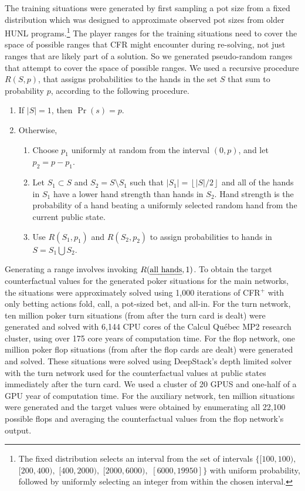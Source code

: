 The training situations were generated by first sampling a pot size from a fixed distribution which was designed to approximate observed pot sizes from older HUNL programs.\footnote{The fixed distribution selects an interval from the set of intervals $\{[100, 100),$ $[200,400),$ $[400, 2000),$ $[2000, 6000),$ $[6000, 19950]\}$ with uniform probability, followed by uniformly selecting an integer from within the chosen interval.}
The player ranges for the training situations need to cover the space of possible ranges that CFR might encounter during re-solving, not just ranges that are likely part of a solution.  So we generated pseudo-random ranges that attempt to cover the space of possible ranges.  We used a recursive procedure $R(S, p)$, that assigns probabilities to the hands in the set $S$ that sum to probability $p$, according to the following procedure.
\begin{enumerate}
\item If $|S| =1$, then $\Pr(s) = p$.
\item Otherwise,
\begin{enumerate}
\item Choose $p_1$ uniformly at random from the interval $(0, p)$, and let $p_2 = p-p_1$.
\item Let $S_1 \subset S$ and $S_2 = S \setminus S_1$ such that $|S_1| = \left\lfloor|S|/2\right\rfloor$ and all of the hands in $S_1$ have a lower hand strength than hands in $S_2$.  Hand strength is the probability of a hand beating a uniformly selected random hand from the current public state.
\item Use $R(S_1, p_1)$ and $R(S_2, p_2)$ to assign probabilities to hands in $S=S_1 \bigcup S_2$.
\end{enumerate}
\end{enumerate}
Generating a range involves invoking $R(\mbox{\em all hands}, 1)$.
To obtain the target counterfactual values for the generated poker situations for the main networks, the situations were approximately solved using 1,000 iterations of CFR$^+$ with only betting actions fold, call, a pot-sized bet, and all-in.  For the turn network, ten million poker turn situations (from after the turn card is dealt) were generated and solved with 6,144 CPU cores of the Calcul Qu\'{e}bec MP2 research cluster, using over 175 core years of computation time.  For the flop network, one million poker flop situations (from after the flop cards are dealt) were generated and solved.  These situations were solved using DeepStack's depth limited solver with the turn network used for the counterfactual values at public states immediately after the turn card.  We used a cluster of 20 GPUS and one-half of a GPU year of computation time.  For the auxiliary network, ten million situations were generated and the target values were obtained by enumerating all 22,100 possible flops and averaging the counterfactual values from the flop network's output.  

